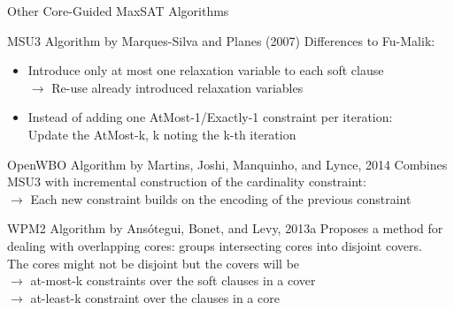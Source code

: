 \documentclass[t,english]{sdqbeamer}
\begin{document}
\begin{frame}{Other Core-Guided MaxSAT Algorithms}
\vspace{-2em}
\begin{block}{MSU3 Algorithm by Marques-Silva and Planes (2007)}
Differences to Fu-Malik:
\begin{itemize}
	\item Introduce only at most one relaxation variable to each soft clause\\
	$\rightarrow$ Re-use already introduced relaxation variables
	\item Instead of adding one AtMost-1/Exactly-1 constraint per iteration:\\
	Update the AtMost-k, k noting the k-th iteration
\end{itemize}
\end{block}

\begin{block}{OpenWBO Algorithm by Martins, Joshi, Manquinho, and Lynce, 2014}
Combines MSU3 with incremental construction of the cardinality constraint:\\
$\rightarrow$ Each new constraint builds on the encoding of the previous constraint
\end{block}

\begin{block}{WPM2 Algorithm by Ansótegui, Bonet, and Levy, 2013a}
Proposes a method for dealing with overlapping cores: groups intersecting cores into disjoint covers.\\
The cores might not be disjoint but the covers will be\\
$\rightarrow$ at-most-k constraints over the soft clauses in a cover\\
$\rightarrow$ at-least-k constraint over the clauses in a core
\end{block}
\end{frame}
\end{document}
